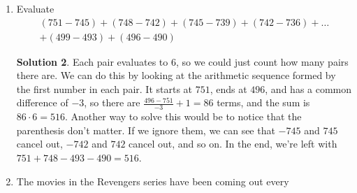 \documentclass{article}
\theoremstyle{definition}
\newtheorem*{solution}{Solution}
\begin{document}
\begin{enumerate}
        Hint: Count the initial fall separately. After the first bounce, the
        ball will rise to $10\left(\frac{2}{3}\right)$ meters before falling
        back down. After the second bounce, the ball will rise up to
        $10\left(\frac{2}{3}\right)^2$ meters before falling back down. This
        continues forever. Consider how far the ball travels between the first
        and second bounce, how far it travels between the second and the third
        bounce, and so on.
        \begin{solution}
            The ball first falls $10$ meters. Then it bounces up
            $10\left(\frac{2}{3}\right)$ meters and falls back down, so it
            traveled $20\left(\frac{2}{3}\right)$ between the first and the
            second bounce. The maximum height after the second bounce is
            $10\left(\frac{2}{3}\right)^2$ meters, so the ball traveled
            $20\left(\frac{2}{3}\right)^2$ meters between the second and third
            bounce. Notice that we have an infinite geometric series here, with
            first term $20\left(\frac{2}{3}\right) = \frac{40}{3}$ and common
            ratio $\frac{2}{3}$. Its sum is $\frac{\frac{40}{3}}{1 -
            \frac{2}{3}} = 40$. Adding the initial $10$ meter fall, we see that
            the ball will travel a total of $40 + 10 = 50$ meters.
        \end{solution}
        \item Evaluate
        \begin{multline*}
            (751 - 745) + (748 - 742) + (745 - 739) + (742 - 736) + \dots \\
            + (499 - 493) + (496 - 490)
        \end{multline*}
        \begin{solution}
            Each pair evaluates to $6$, so we could just count how many pairs
            there are. We can do this by looking at the arithmetic sequence
            formed by the first number in each pair. It starts at $751$, ends at
            $496$, and has a common difference of $-3$, so there are $\frac{496
            - 751}{-3} + 1 = 86$ terms, and the sum is $86 \cdot 6 = 516$.
            Another way to solve this would be to notice that the parenthesis
            don't matter. If we ignore them, we can see that $-745$ and $745$
            cancel out, $-742$ and $742$ cancel out, and so on. In the end,
            we're left with $751 + 748 - 493 - 490 = 516$.
        \end{solution}
        \item The movies in the Revengers series have been coming out every

\end{enumerate}
\end{document}
